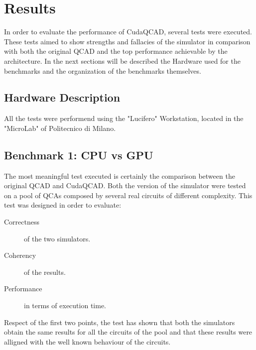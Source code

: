 \chapter{Results}\label{sec:results}
In order to evaluate the performance of CudaQCAD, several tests were executed. These tests aimed to show strengths and fallacies of the simulator in comparison with both the original QCAD and the top performance achievable by the architecture. In the next sections will be described the Hardware used for the benchmarks and the organization of the benchmarks themselves.
 
\section{Hardware Description}
All the tests were performend using the "Lucifero" Workstation, located in the "MicroLab" of Politecnico di Milano. 

\section{Benchmark 1: CPU vs GPU}
The most meaningful test executed is certainly the comparison between the original QCAD and CudaQCAD. Both the version of the simulator were tested on a pool of QCAs composed by several real circuits of different complexity. This test was designed in order to evaluate:

\begin{description}
\item[Correctness] of the two simulators.
\item[Coherency] of the results.
\item[Performance] in terms of execution time.
\end{description}    

Respect of the first two points, the test has shown that both the simulators obtain the same results for all the circuits of the pool and that these results were alligned with the well known behaviour of the circuits.\\
 

